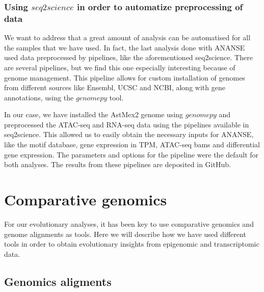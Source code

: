 \subsubsection{Using $seq2science$ in order to automatize preprocessing of data}

We want to address that a great amount of analysis can be automatised for all the samples that we have used. In fact, the last analysis done with ANANSE used data preprocessed by pipelines, like the aforementioned seq2science. There are several pipelines, but we find this one especially interesting because of genome management. This pipeline allows for custom installation of genomes from different sources like Ensembl, UCSC and NCBI, along with gene annotations, using the $genomepy$ tool.

In our case, we have installed the AstMex2 genome using $genomepy$ and preprocessed the ATAC-seq and RNA-seq data using the pipelines available in seq2science. This allowed us to easily obtain the necessary inputs for ANANSE, like the motif database, gene expression in TPM, ATAC-seq bams and differential gene expression. The parameters and options for the pipeline were the default for both analyses. The results from these pipelines are deposited in GitHub.

\section{Comparative genomics}
\label{sec:comp_genomics}
For our evolutionary analyses, it has been key to use comparative genomics and genome alignments as tools. Here we will describe how we have used different tools in order to obtain evolutionary insights from epigenomic and transcriptomic data.

\subsection{Genomics aligments}

